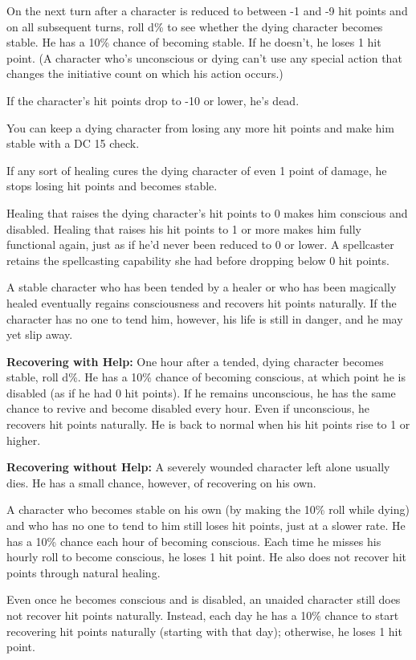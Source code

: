 On the next turn after a character is reduced to between -1 and -9 hit points and 
on all subsequent turns, roll d\% to see whether the dying character becomes stable. 
He has a 10\% chance of becoming stable. If he doesn't, he loses 1 hit point. (A 
character who's unconscious or dying can't use any special action that changes 
the initiative count on which his action occurs.)

If the character's hit points drop to -10 or lower, he's dead.

You can keep a dying character from losing any more hit points and make him stable 
with a DC 15  check.

If any sort of healing cures the dying character of even 1 point of damage, he 
stops losing hit points and becomes stable.

Healing that raises the dying character's hit points to 0 makes him conscious and 
disabled. Healing that raises his hit points to 1 or more makes him fully functional 
again, just as if he'd never been reduced to 0 or lower. A spellcaster retains 
the spellcasting capability she had before dropping below 0 hit points.

A stable character who has been tended by a healer or who has been magically healed 
eventually regains consciousness and recovers hit points naturally. If the character 
has no one to tend him, however, his life is still in danger, and he may yet slip 
away.

\textbf{Recovering with Help:} One hour after a tended, dying character becomes 
stable, roll d\%. He has a 10\% chance of becoming conscious, at which point he 
is disabled (as if he had 0 hit points). If he remains unconscious, he has the 
same chance to revive and become disabled every hour. Even if unconscious, he recovers 
hit points naturally. He is back to normal when his hit points rise to 1 or higher.

\textbf{Recovering without Help:} A severely wounded character left alone usually 
dies. He has a small chance, however, of recovering on his own. 

A character who becomes stable on his own (by making the 10\% roll while dying) 
and who has no one to tend to him still loses hit points, just at a slower rate. 
He has a 10\% chance each hour of becoming conscious. Each time he misses his hourly 
roll to become conscious, he loses 1 hit point. He also does not recover hit points 
through natural healing.

Even once he becomes conscious and is disabled, an unaided character still does 
not recover hit points naturally. Instead, each day he has a 10\% chance to start 
recovering hit points naturally (starting with that day); otherwise, he loses 1 
hit point.

